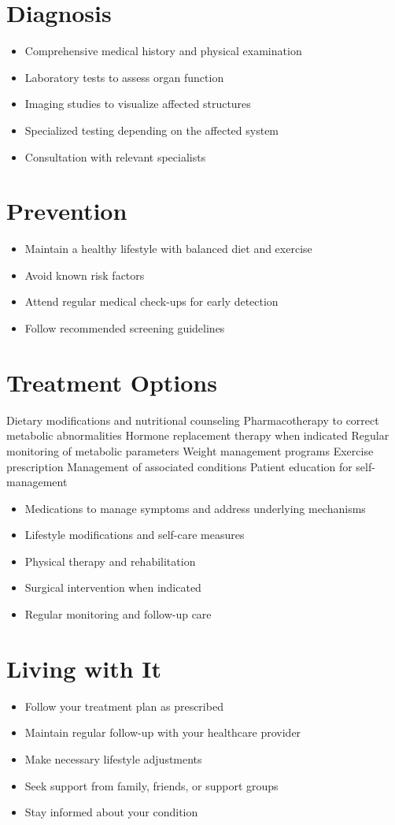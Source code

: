 \section{Diagnosis}
\begin{itemize}[noitemsep]
  \item Comprehensive medical history and physical examination
  \item Laboratory tests to assess organ function
  \item Imaging studies to visualize affected structures
  \item Specialized testing depending on the affected system
  \item Consultation with relevant specialists
\end{itemize}
\section{Prevention}
\begin{itemize}[noitemsep]
  \item Maintain a healthy lifestyle with balanced diet and exercise
  \item Avoid known risk factors
  \item Attend regular medical check-ups for early detection
  \item Follow recommended screening guidelines
\end{itemize}
\section{Treatment Options}
Dietary modifications and nutritional counseling Pharmacotherapy to correct metabolic abnormalities Hormone replacement therapy when indicated Regular monitoring of metabolic parameters Weight management programs Exercise prescription Management of associated conditions Patient education for self-management

\begin{itemize}[noitemsep]
  \item Medications to manage symptoms and address underlying mechanisms
  \item Lifestyle modifications and self-care measures
  \item Physical therapy and rehabilitation
  \item Surgical intervention when indicated
  \item Regular monitoring and follow-up care
\end{itemize}
\section{Living with It}
\begin{itemize}[noitemsep]
  \item Follow your treatment plan as prescribed
  \item Maintain regular follow-up with your healthcare provider
  \item Make necessary lifestyle adjustments
  \item Seek support from family, friends, or support groups
  \item Stay informed about your condition
\end{itemize}
